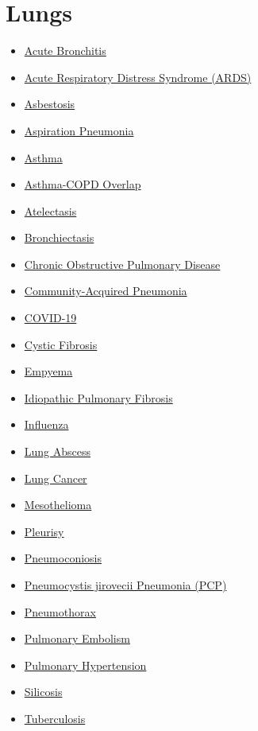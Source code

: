\section*{Lungs}
\label{sec:organ_lungs}
\begin{itemize}[noitemsep]
  \item \hyperlink{sec:Acute Bronchitis}{Acute Bronchitis}
  \item \hyperlink{sec:Acute Respiratory Distress Syndrome}{Acute Respiratory Distress Syndrome (ARDS)}
  \item \hyperlink{sec:Asbestosis}{Asbestosis}
  \item \hyperlink{sec:Aspiration Pneumonia}{Aspiration Pneumonia}
  \item \hyperlink{sec:Asthma}{Asthma}
  \item \hyperlink{sec:Asthma-COPD Overlap}{Asthma-COPD Overlap}
  \item \hyperlink{sec:Atelectasis}{Atelectasis}
  \item \hyperlink{sec:Bronchiectasis}{Bronchiectasis}
  \item \hyperlink{sec:Chronic Obstructive Pulmonary Disease}{Chronic Obstructive Pulmonary Disease}
  \item \hyperlink{sec:Community-Acquired Pneumonia}{Community-Acquired Pneumonia}
  \item \hyperlink{sec:COVID-19}{COVID-19}
  \item \hyperlink{sec:Cystic Fibrosis}{Cystic Fibrosis}
  \item \hyperlink{sec:Empyema}{Empyema}
  \item \hyperlink{sec:Idiopathic Pulmonary Fibrosis}{Idiopathic Pulmonary Fibrosis}
  \item \hyperlink{sec:Influenza}{Influenza}
  \item \hyperlink{sec:Lung Abscess}{Lung Abscess}
  \item \hyperlink{sec:Lung Cancer}{Lung Cancer}
  \item \hyperlink{sec:Mesothelioma}{Mesothelioma}
  \item \hyperlink{sec:Pleurisy}{Pleurisy}
  \item \hyperlink{sec:Pneumoconiosis}{Pneumoconiosis}
  \item \hyperlink{sec:Pneumocystis jirovecii Pneumonia}{Pneumocystis jirovecii Pneumonia (PCP)}
  \item \hyperlink{sec:Pneumothorax}{Pneumothorax}
  \item \hyperlink{sec:Pulmonary Embolism}{Pulmonary Embolism}
  \item \hyperlink{sec:Pulmonary Hypertension}{Pulmonary Hypertension}
  \item \hyperlink{sec:Silicosis}{Silicosis}
  \item \hyperlink{sec:Tuberculosis}{Tuberculosis}
\end{itemize}

